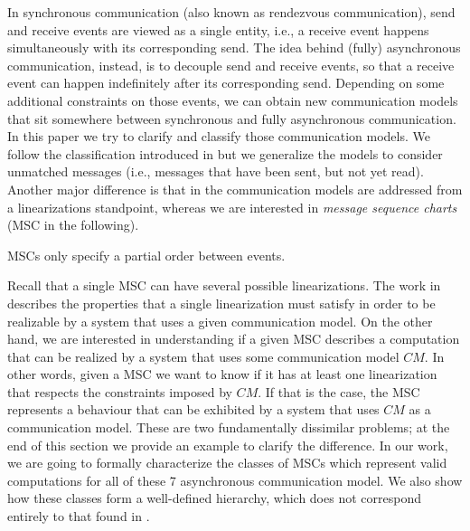


In synchronous communication (also known as rendezvous communication), send and receive events are  viewed as a single entity, i.e., a receive event  happens simultaneously with its corresponding send. The  idea behind (fully) asynchronous communication, instead, is to decouple send and receive events, so that a receive event can happen indefinitely after its corresponding send. Depending on some additional constraints on those events, we can obtain new communication models that sit somewhere between synchronous and fully asynchronous communication. 
In this paper we try to clarify and classify those communication models. We follow the classification introduced in \cite{DBLP:journals/fac/ChevrouHQ16} but we generalize the models to  consider unmatched messages (i.e., messages that have been sent, but not yet read). Another major difference is that in \cite{DBLP:journals/fac/ChevrouHQ16} the communication models are addressed from a linearizations standpoint, whereas we are interested in \emph{message sequence charts} (MSC in the following). 

MSCs only specify a partial order between events. 


Recall that a single MSC can have several possible linearizations. The work in \cite{DBLP:journals/fac/ChevrouHQ16} describes the properties that a single linearization must satisfy in order to be realizable by a system that uses a given communication model. On the other hand, we are interested in understanding if a given MSC describes a computation that can be realized by a system that uses some communication model $CM$. In other words, given a MSC we want to know if it has at least one linearization that respects the constraints imposed by $CM$. If that is the case, the MSC represents a behaviour that can be exhibited by a system that uses $CM$ as a communication model. These are two fundamentally dissimilar problems; at the end of this section we provide an example to clarify the difference. In our work, we are going to formally characterize the classes of MSCs which represent valid computations for all of these 7 asynchronous communication model. We also show how these classes form a well-defined hierarchy, which does not correspond entirely to that found in \cite{DBLP:journals/fac/ChevrouHQ16}.


